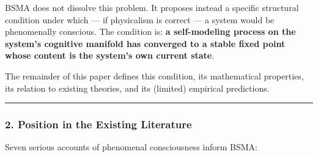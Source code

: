 \documentclass[
  11pt,
  a4paper,
]{article}
\begin{document}
BSMA does not dissolve this problem. It proposes instead a specific
structural condition under which --- if physicalism is correct --- a
system would be phenomenally conscious. The condition is: \textbf{a
self-modeling process on the system's cognitive manifold has converged
to a stable fixed point whose content is the system's own current
state}.

The remainder of this paper defines this condition, its mathematical
properties, its relation to existing theories, and its (limited)
empirical predictions.

\begin{center}\rule{0.5\linewidth}{0.5pt}\end{center}

\subsubsection{2. Position in the Existing
Literature}\label{position-in-the-existing-literature}

Seven serious accounts of phenomenal consciousness inform BSMA:
\end{document}
